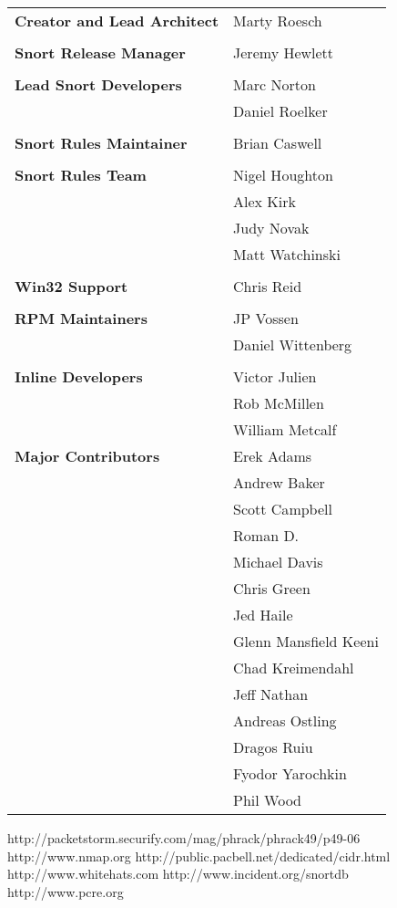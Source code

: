 \documentclass[english]{report}
\begin{document}
\begin{tabular}{p{3in} p{3in}}

\textbf{Creator and Lead Architect} &	 Marty Roesch\\
\\
\textbf{Snort Release Manager} &	 Jeremy Hewlett\\
\\
\textbf{Lead Snort Developers} &	 Marc Norton\\
 & 					 Daniel Roelker\\
\\
\textbf{Snort Rules Maintainer} & 	 Brian Caswell\\
\\
\textbf{Snort Rules Team} &		 Nigel Houghton\\
 		& 			Alex Kirk\\
		&			Judy Novak\\
		&			Matt Watchinski\\
\\
\textbf{Win32 Support} &	 	Chris Reid\\
\\
\textbf{RPM Maintainers} &	 	JP Vossen\\
			&		Daniel Wittenberg\\
\\
\textbf{Inline Developers} &	 	Victor Julien\\
				&	Rob McMillen\\
				& 	William Metcalf\\

\textbf{Major Contributors} & 	Erek Adams\\
		&		Andrew Baker\\
		&		Scott Campbell\\
		&		Roman D.\\
		&		Michael Davis\\
		&		Chris Green\\
		&		Jed Haile\\
		&		Glenn Mansfield Keeni\\
		&		Chad Kreimendahl\\
		&		Jeff Nathan\\
		&		Andreas Ostling\\
		&		Dragos Ruiu\\
		&		Fyodor Yarochkin\\
		&		Phil Wood
\end{tabular}
\appendix

\begin{thebibliography}{99}
http://packetstorm.securify.com/mag/phrack/phrack49/p49-06
http://www.nmap.org
http://public.pacbell.net/dedicated/cidr.html
http://www.whitehats.com
http://www.incident.org/snortdb
http://www.pcre.org
\end{thebibliography}
\end{document}

